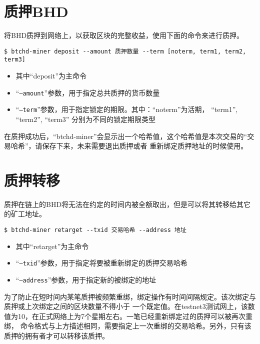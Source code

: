 \section{质押BHD}
\begin{flushleft}
    将BHD质押到网络上，以获取区块的完整收益，使用下面的命令来进行质押。
\end{flushleft}
\scriptsize
\begin{verbatim}
$ btchd-miner deposit --amount 质押数量 --term [noterm, term1, term2, term3]
\end{verbatim}
\normalsize
\begin{itemize}
    \item 其中``deposit''为主命令
    \item ``\texttt{--amount}''参数，用于指定总共质押的货币数量
    \item ``\texttt{--term}''参数，用于指定锁定的期限。其中：``noterm''为活期， ``term1'', ``term2'', ``term3''
        分别为不同的锁定期限类型
\end{itemize}
\begin{flushleft}
    在质押成功后，``btchd-miner''会显示出一个哈希值，这个哈希值是本次交易的``交易哈希''，请保存下来，未来需要退出质押或者
    重新绑定质押地址的时候使用。
\end{flushleft}
\section{质押转移}
\begin{flushleft}
    质押在链上的BHD将无法在约定的时间内被全额取出，但是可以将其转移给其它的矿工地址。
\end{flushleft}
\scriptsize
\begin{verbatim}
$ btchd-miner retarget --txid 交易哈希 --address 地址
\end{verbatim}
\normalsize
\begin{itemize}
    \item 其中``retarget''为主命令
    \item ``\texttt{--txid}''参数，用于指定将要被重新绑定的质押交易哈希
    \item ``\texttt{--address}''参数，用于指定新的被绑定的地址
\end{itemize}
\begin{flushleft}
    为了防止在短时间内某笔质押被频繁重绑，绑定操作有时间间隔规定。该次绑定与质押或上次绑定之间的区块数量不得小于
    一个既定值。在testnet3测试网上，该数值为10，在正式网络上为7个星期左右。一笔已经重新绑定过的质押可以被再次重绑，
    命令格式与上方描述相同，需要指定上一次重绑的交易哈希。另外，只有该质押的拥有者才可以转移该质押。
\end{flushleft}
